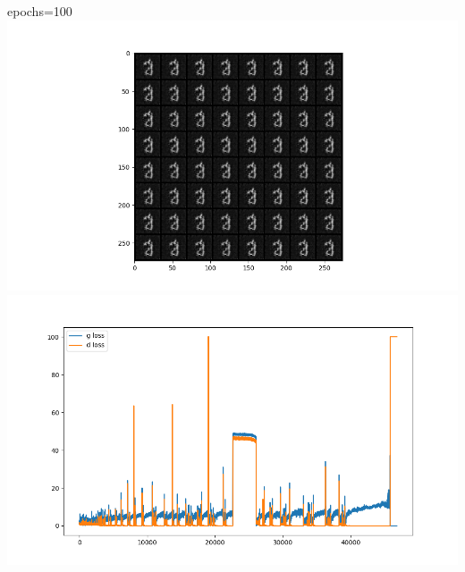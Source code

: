 epochs=100 \includegraphics{./images/Pasted image 20231229114320.png}
\includegraphics{./images/Pasted image 20231229114328.png}

